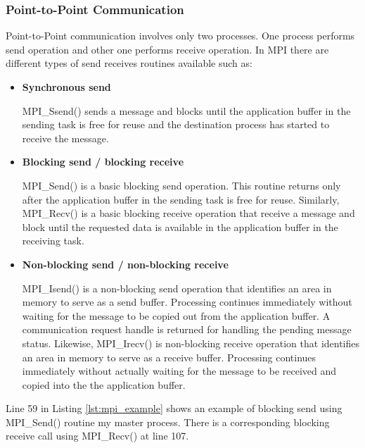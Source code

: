 \subsubsection{Point-to-Point Communication}
Point-to-Point communication involves only two processes. One process performs send operation and other one performs receive operation. In MPI there are different types of send receives routines available such as:
\begin{itemize}
    \item \textbf{Synchronous send}
    
MPI\_Ssend() sends a message and blocks until the application buffer in the sending task is free for reuse and the destination process has started to receive the message.
    
    \item \textbf{Blocking send / blocking receive}
    
MPI\_Send()  is a basic blocking send operation. This routine returns only after the application buffer in the sending task is free for reuse. Similarly, MPI\_Recv() is a basic blocking receive operation that receive a message and block until the requested data is available in the application buffer in the receiving task.

    \item \textbf{Non-blocking send / non-blocking receive}
    
MPI\_Isend() is a non-blocking send operation that identifies an area in memory to serve as a send buffer. Processing continues immediately without waiting for the message to be copied out from the application buffer. A communication request handle is returned for handling the pending message status. Likewise, MPI\_Irecv()  is non-blocking  receive operation that identifies an area in memory to serve as a receive buffer. Processing continues immediately without actually waiting for the message to be received and copied into the the application buffer.

\end{itemize}
\citep{Barney:16-mpi}

Line 59 in Listing \ref{lst:mpi_example} shows an example of blocking send using MPI\_Send() routine my master process. There is a corresponding blocking receive call using MPI\_Recv() at line 107.

